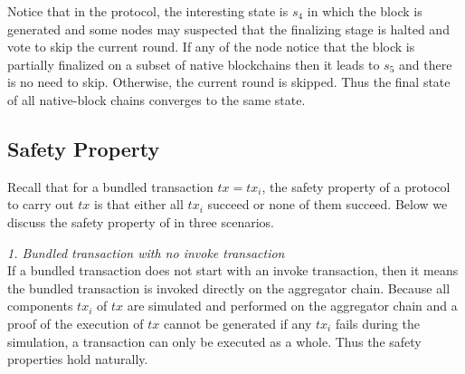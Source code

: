 Notice that in the protocol, the interesting state is $s_4$ in which the block is generated and some nodes may suspected that the finalizing stage is halted and vote to skip the current round. If any of the node notice that the block is partially finalized on a subset of native blockchains then it leads to $s_5$ and there is no need to skip. Otherwise, the current round is skipped. Thus the final state of all native-block chains converges to the same state.

\subsection{Safety Property}
Recall that for a bundled transaction $tx = {tx_i}$, the safety property of a protocol to carry out $tx$ is that either all $tx_i$ succeed or none of them succeed. Below we discuss the safety property of \dprotocol in three scenarios.



\smallskip\noindent\emph{1. Bundled transaction with no invoke transaction}\\
If a bundled transaction does not start with an invoke transaction, then it means the bundled transaction is invoked directly on the aggregator chain. Because all components $tx_i$ of $tx$ are simulated and performed on the aggregator chain and a proof of the execution of $tx$ cannot be generated if any $tx_i$ fails during the simulation, a transaction can only be executed as a whole. Thus the safety properties hold naturally.



